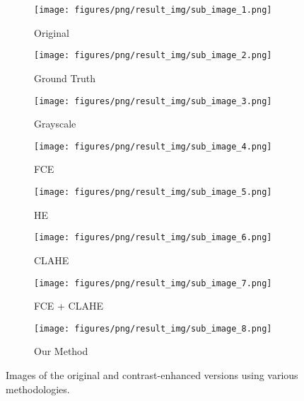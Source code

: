 \begin{figure}[h]
    \centering
    \begin{subfigure}{0.24\linewidth}
        \texttt{[image: figures/png/result\_img/sub\_image\_1.png]}
        \caption{Original}
        \label{fig:res_original}
    \end{subfigure}
    \begin{subfigure}{0.24\linewidth}
        \texttt{[image: figures/png/result\_img/sub\_image\_2.png]}
        \caption{Ground Truth}
        \label{fig:res_segmentation}
    \end{subfigure}
    \begin{subfigure}{0.24\linewidth}
        \texttt{[image: figures/png/result\_img/sub\_image\_3.png]}
        \caption{Grayscale}
        \label{fig:res_grayscale}
    \end{subfigure}
    \begin{subfigure}{0.24\linewidth}
        \texttt{[image: figures/png/result\_img/sub\_image\_4.png]}
        \caption{FCE}
        \label{fig:res_fuzzy}
    \end{subfigure}
    
    \begin{subfigure}{0.24\linewidth}
        \texttt{[image: figures/png/result\_img/sub\_image\_5.png]}
        \caption{HE}
        \label{fig:res_HE}
    \end{subfigure}
    \begin{subfigure}{0.24\linewidth}
        \texttt{[image: figures/png/result\_img/sub\_image\_6.png]}
        \caption{CLAHE}
        \label{fig:res_CLAHE}
    \end{subfigure}
    \begin{subfigure}{0.24\linewidth}
        \texttt{[image: figures/png/result\_img/sub\_image\_7.png]}
        \caption{FCE + CLAHE}
        \label{fig:res_fuzzy_clahe}
    \end{subfigure}
    \begin{subfigure}{0.24\linewidth}
        \texttt{[image: figures/png/result\_img/sub\_image\_8.png]}
        \caption{Our Method}
        \label{fig:res_proposed}
    \end{subfigure}

    \caption{Images of the original and contrast-enhanced versions using various methodologies.}
    \label{fig:res_comparison}
\end{figure}